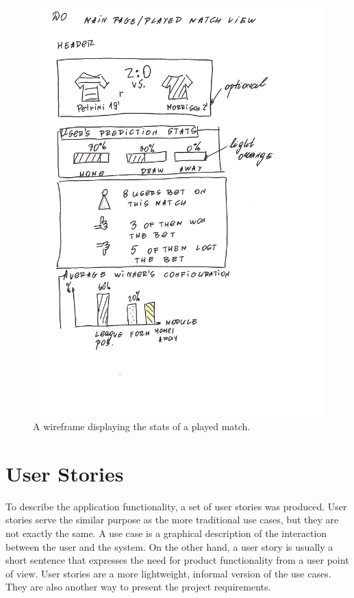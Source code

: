 \begin{figure}[H]
	\begin{center}
		\includegraphics[width=.90\textwidth]{design/images/D0.jpg}
		\caption{A wireframe displaying the stats of a played match.} \label{fig:using:wireframe_d0}
	\end{center}
\end{figure}

\section{User Stories}
\label{userstories_design}
To describe the application functionality, a set of user stories was produced. User stories serve the similar purpose as the more traditional use cases, but they are not exactly the same. A use case is a graphical description of the interaction between the user and the system. On the other hand, a user story is usually a short sentence that expresses the need for product functionality from a user point of view. User stories are a more lightweight, informal version of the use cases. They are also another way to present the project requirements.

